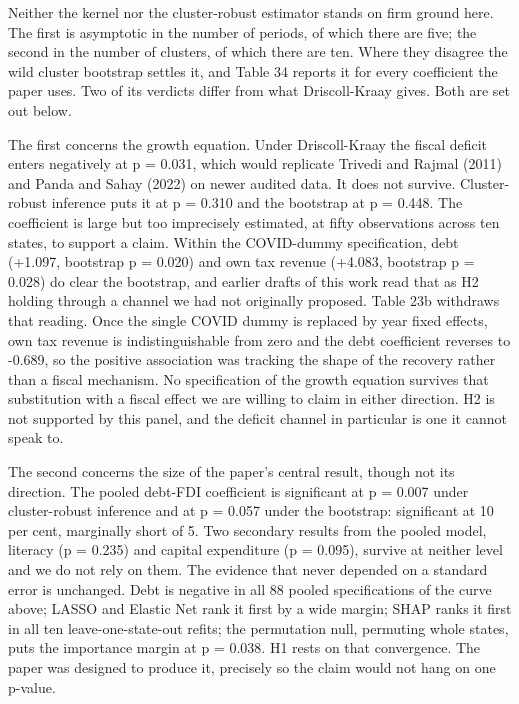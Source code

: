 \documentclass[12pt,a4paper]{article}
\begin{document}
Neither the kernel nor the cluster-robust estimator stands on firm ground here. The first is asymptotic in the number of periods, of which there are five; the second in the number of clusters, of which there are ten. Where they disagree the wild cluster bootstrap settles it, and Table 34 reports it for every coefficient the paper uses. Two of its verdicts differ from what Driscoll-Kraay gives. Both are set out below.

The first concerns the growth equation. Under Driscoll-Kraay the fiscal deficit enters negatively at p = 0.031, which would replicate Trivedi and Rajmal (2011) and Panda and Sahay (2022) on newer audited data. It does not survive. Cluster-robust inference puts it at p = 0.310 and the bootstrap at p = 0.448. The coefficient is large but too imprecisely estimated, at fifty observations across ten states, to support a claim. Within the COVID-dummy specification, debt (+1.097, bootstrap p = 0.020) and own tax revenue (+4.083, bootstrap p = 0.028) do clear the bootstrap, and earlier drafts of this work read that as H2 holding through a channel we had not originally proposed. Table 23b withdraws that reading. Once the single COVID dummy is replaced by year fixed effects, own tax revenue is indistinguishable from zero and the debt coefficient reverses to -0.689, so the positive association was tracking the shape of the recovery rather than a fiscal mechanism. No specification of the growth equation survives that substitution with a fiscal effect we are willing to claim in either direction. H2 is not supported by this panel, and the deficit channel in particular is one it cannot speak to.

The second concerns the size of the paper's central result, though not its direction. The pooled debt-FDI coefficient is significant at p = 0.007 under cluster-robust inference and at p = 0.057 under the bootstrap: significant at 10 per cent, marginally short of 5. Two secondary results from the pooled model, literacy (p = 0.235) and capital expenditure (p = 0.095), survive at neither level and we do not rely on them. The evidence that never depended on a standard error is unchanged. Debt is negative in all 88 pooled specifications of the curve above; LASSO and Elastic Net rank it first by a wide margin; SHAP ranks it first in all ten leave-one-state-out refits; the permutation null, permuting whole states, puts the importance margin at p = 0.038. H1 rests on that convergence. The paper was designed to produce it, precisely so the claim would not hang on one p-value.
\end{document}
